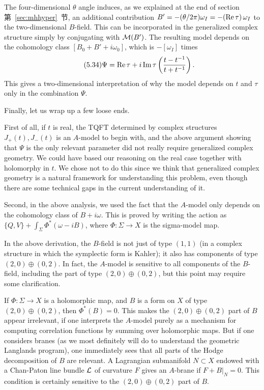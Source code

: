The four-dimensional $\theta$ angle induces, as we explained at
the end of section 第~\ref{sec:mhhyper}~节, an additional contribution
$B'=-(\theta/2\pi)\omega_I=-({\rm Re}\,\tau)\,\omega_I$ to the
two-dimensional $B$-field. This can be incorporated in the
generalized complex structure simply by conjugating with ${\cal
M}(B')$.  The resulting model depends on the cohomology class
$[B_0+B'+i\omega_0]$, which is $-[\omega_I]$ times
\begin{equation*}
\tag*{(5.34)}
\Psi={\rm Re}\,\tau +i\,{\rm Im}\,\tau
\left(t-t^{-1}\over t+t^{-1}\right).
\end{equation*}
 This gives a two-dimensional
interpretation of why the model depends on $t$ and $\tau$ only in
the combination $\Psi$.

\par{}

Finally, let us wrap up a few loose ends.

First of all, if $t$ is real, the TQFT determined by complex
structures $J_+(t),J_-(t)$ is an $A$-model to begin with, and the
above argument showing that $\Psi$ is the only relevant parameter
did not really require generalized complex geometry.   We could have based our
reasoning on the real case together with holomorphy in $t$.     We chose not to do this since
 we think that generalized
complex geometry is a natural framework for understanding this problem, even though there are
some technical gaps in the current understanding of it.

Second, in the above analysis, we used the fact that the $A$-model
only depends on the cohomology class of $B+i\omega$.  This is
proved by writing the action as $\{Q,V\}+\int_\Sigma
\Phi^*(\omega-iB)$, where  $\Phi:\Sigma\to X$ is the sigma-model
map.

In the above derivation, the $B$-field is not just of type $(1,1)$
(in a complex structure in which the symplectic form is Kahler);
it also has components of type $(2,0)\oplus (0,2)$. In fact, the
$A$-model is sensitive to all components of the $B$-field,
including the part of type $(2,0)\oplus (0,2)$, but this point may
require some clarification.

If $\Phi:\Sigma\to X$ is a holomorphic map, and $B$ is a form on
$X$ of type $(2,0)\oplus (0,2)$, then $\Phi^*(B)=0$.  This makes
the $(2,0)\oplus (0,2)$ part of $B$ appear irrelevant, if one
interprets the $A$-model purely as a mechanism for computing
correlation functions by summing over holomorphic maps. But if one
considers branes (as we most definitely will do to understand the
geometric Langlands program), one immediately sees that all parts
of the Hodge decomposition of $B$ are relevant.  A Lagrangian
submanifold $N\subset X$ endowed with a Chan-Paton line bundle
${\cal L}$ of curvature $F$ gives an $A$-brane if $F+B|_N=0$. This
condition is certainly sensitive to the $(2,0)\oplus (0,2)$ part
of $B$.

